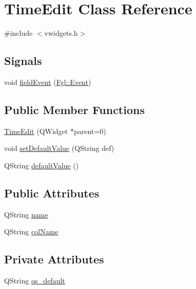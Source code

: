 \hypertarget{classTimeEdit}{
\section{TimeEdit Class Reference}
\label{classTimeEdit}
}


{\ttfamily \#include $<$vwidgets.h$>$}

\subsection*{Signals}
\begin{DoxyCompactItemize}
\item 
void \hyperlink{classTimeEdit_a11b6660b3a4d123356e40317221540a7}{fieldEvent} (\hyperlink{structFgl_1_1Event}{Fgl::Event})
\end{DoxyCompactItemize}
\subsection*{Public Member Functions}
\begin{DoxyCompactItemize}
\item 
\hyperlink{classTimeEdit_a1dba63d1c94db962ac6c4057250c6068}{TimeEdit} (QWidget $\ast$parent=0)
\item 
void \hyperlink{classTimeEdit_a7c875c6b11df46d3a5bc64934ec60094}{setDefaultValue} (QString def)
\item 
QString \hyperlink{classTimeEdit_a592f12b848148054c25de5da6e49efa0}{defaultValue} ()
\end{DoxyCompactItemize}
\subsection*{Public Attributes}
\begin{DoxyCompactItemize}
\item 
QString \hyperlink{classTimeEdit_a8ea8f0f841d47d07ea4fc366a3fe6b14}{name}
\item 
QString \hyperlink{classTimeEdit_aa1be57eb10b98b173bde5e79d0a89d59}{colName}
\end{DoxyCompactItemize}
\subsection*{Private Attributes}
\begin{DoxyCompactItemize}
\item 
QString \hyperlink{classTimeEdit_a85056d246a80b2ee73c2303e7ca9b7cf}{qs\_\-default}
\end{DoxyCompactItemize}


